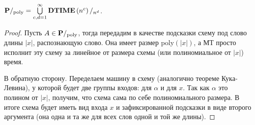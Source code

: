 \begin{statement} $\textbf{P}/_{\mathrm{poly}} = \bigcup\limits_{c, d = 1}^\infty \textbf{$\mathbf{DTIME}\left({n^c}\right)/_{n^d}$}$. \end{statement}

\begin{proof} Пусть $A \in \textbf{P}/_{\mathrm{poly}}$, тогда передадим в качестве подсказки схему под слово длины $|x|$, распознающую слово. Она имеет размер poly$(|x|)$, а МТ просто исполнит эту схему за линейное от размера схемы (или полиномиальное от $|x|$) время.

В обратную сторону. Переделаем машину в схему (аналогично теореме Кука-Левина), у которой будет две группы входов: для $\alpha$ и для $x$. Так как $\alpha$ это полином от $|x|$, получим, что схема сама по себе полиномиального размера. В итоге схема будет иметь вид входа $x$ и зафиксированной подсказки в виде второго аргумента (она одна и та же для всех слов одной и той же длины).

\end{proof}